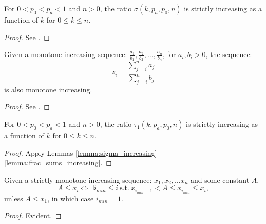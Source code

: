 \begin{lemma}
    \label{lemma:sigma_increasing}
For $0<p_0< p_a< 1$ and $n>0$, the ratio $\sigma(k,p_a,p_0,n)$ is strictly increasing as a function of $k$ for $0\le k\le n$.
\end{lemma}
\begin{proof}
See \cite[Lemma 4]{usenix_minerva}. 
\end{proof}

\begin{lemma}
    \label{lemma:frac_sums_increasing}
    Given a monotone increasing sequence: $\frac{a_1}{b_1}, \frac{a_2}{b_2}, \ldots, \frac{a_n}{b_n}$, for $a_i, b_i > 0$, the sequence:
    $$z_i = \frac{\sum_{j=i}^n a_j}{\sum_{j=i}^n b_j}$$
    is also monotone increasing.
\end{lemma}

\begin{proof}
See \cite[Lemma 2]{usenix_minerva}. 
\end{proof}

\begin{lemma}
    \label{lemma:tau1_increasing}
For $0<p_0< p_a< 1$ and $n>0$, the ratio $\tau_1(k,p_a,p_0,n)$ is strictly increasing as a function of $k$ for $0\le k\le n$.
\end{lemma}
\begin{proof}
    Apply Lemmas \ref{lemma:sigma_increasing}-\ref{lemma:frac_sums_increasing}.
\end{proof}
\begin{lemma}
    \label{lemma:imin-exists}
    Given a strictly monotone increasing sequence: $x_1, x_2, \ldots x_n $ and some constant $A$,
    $$A \le x_i \Leftrightarrow \exists i_{min} \le i ~\text{s.t.}~   x_{i_{min} -1} < A \le x_{i_{min}} \le x_{i},$$
    unless $A\le x_1$, in which case $i_{min} =1 $.
\end{lemma}
\begin{proof}
    Evident.
\end{proof}

